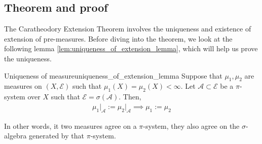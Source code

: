 \subsection{Theorem and proof}
The Caratheodory Extension Theorem involves the uniqueness and existence of extension of pre-measures. Before diving into the theorem, we look at the following lemma \ref{lem:uniqueness_of_extension_lemma}, which will help us prove the uniqueness.
\begin{proposition}{Uniqueness of measure}{uniqueness_of_extension_lemma}
    Suppose that $\mu_1, \mu_2$ are measures on $(X, \mathcal{E})$ such that $\mu_1(X)=\mu_2(X)<\infty$. Let $\mathcal{A}\subset\mathcal{E}$ be a $\pi$-system over $X$ such that $\mathcal{E}=\sigma(\mathcal{A})$. Then,
    \begin{align*}
        \mu_1\Big|_{\mathcal{A}} := \mu_2\Big|_{\mathcal{A}} \implies \mu_1 := \mu_2
    \end{align*}

    In other words, it two measures agree on a $\pi$-system, they also agree on the $\sigma$-algebra generated by that $\pi$-system.
\end{proposition}

